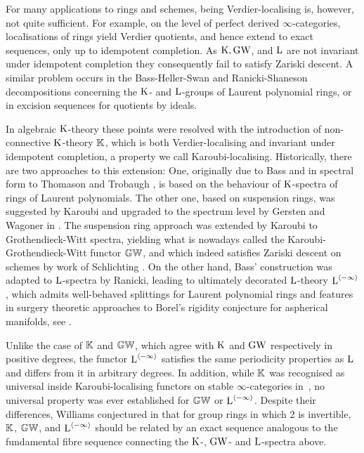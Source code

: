 For many applications to rings and schemes, being Verdier-localising is, however, not quite sufficient. For example, on the level of perfect derived $\infty$-categories, localisations of rings yield Verdier quotients, and hence extend to exact sequences,
only up to idempotent completion. As $\operatorname K,\operatorname{GW}$, and $\operatorname L$ are not invariant under idempotent completion they consequently fail to satisfy Zariski descent. 
A similar problem occurs 
in the Bass-Heller-Swan and Ranicki-Shaneson decompositions concerning the $\operatorname K$- and $\operatorname L$-groups of Laurent polynomial rings, or in excision sequences for quotients by ideals.

In algebraic $\operatorname K$-theory these points were resolved with the introduction of non-connective $\operatorname K$-theory $\mathbb K$, which is both Verdier-localising and invariant under idempotent completion, a property we call Karoubi-localising. 
Historically, there are two approaches to this extension: One, originally due to Bass and in spectral form to Thomason and Trobaugh \cites{Bass,thomason-trobaugh}, is based on the behaviour of $\operatorname K$-spectra of rings of Laurent polynomials. The other one, based on suspension rings, was suggested by Karoubi and upgraded to the spectrum level by Gersten and Wagoner in \cite{karoubi-foncteurs,gersten-spectrum, wagoner-delooping}. 
The suspension ring approach was extended by Karoubi to Grothendieck-Witt spectra, yielding what is nowadays called the Karoubi-Grothendieck-Witt functor $\mathbb{GW}$,
and which indeed satisfies Zariski descent on schemes by work of Schlichting \cites{schlichting-mv,schlichting-derived}. On the other hand, Bass' construction was adapted to $\operatorname L$-spectra by Ranicki, leading to ultimately decorated $\operatorname L$-theory $\operatorname L^{\langle -\infty \rangle}$, which admits well-behaved splittings for Laurent polynomial rings and %
features in %
surgery theoretic approaches to Borel's rigidity conjecture for aspherical manifolds, see 
\cite{Lueck-FJbook}. 

Unlike the case of $\mathbb K$ and $\mathbb{GW}$, which agree with $\operatorname K$ and $\operatorname{GW}$ respectively in positive degrees, %
the functor $\operatorname L^{\langle -\infty \rangle}$ satisfies the same periodicity properties as $\operatorname L$
and 
differs from it in arbitrary degrees. In addition, while $\mathbb K$ was recognised as universal inside Karoubi-localising functors 
on stable $\infty$-categories in~\cite{BGT}, no universal property was ever established for $\mathbb{GW}$ or $\operatorname L^{\langle -\infty \rangle}$.
Despite their differences, Williams conjectured in \cite{williams-quadratic} that for group rings in which 2 is invertible, $\mathbb K$, $\mathbb{GW}$, and $\operatorname L^{\langle -\infty \rangle}$ should be related by an exact sequence analogous to the fundamental fibre sequence connecting the $\operatorname K$-, $\operatorname{GW}$- and $\operatorname L$-spectra above.

